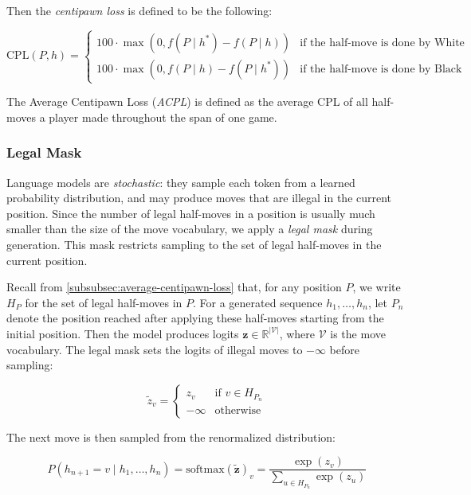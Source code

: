 \documentclass[11pt, a4paper]{article}
\begin{document}
Then the \textit{centipawn loss} is defined to be the following:

\[
\text{CPL}(P, h) = 
\begin{cases}
100 \cdot \max(0, f(P \mid h^*) - f(P \mid h)) &\text{if the half-move is done by White} \\
100 \cdot \max(0, f(P \mid h) - f(P \mid h^*)) &\text{if the half-move is done by Black}
\end{cases}
\]

The Average Centipawn Loss (\textit{ACPL}) is defined as the average CPL of all half-moves a player made throughout the span of one game.

\subsubsection{Legal Mask} \label{sec:legal-mask}

Language models are \textit{stochastic}: they sample each token from a learned probability distribution, and may produce moves that are illegal in the current position. Since the number of legal half-moves in a position is usually much smaller than the size of the move vocabulary, we apply a \textit{legal mask} during generation. This mask restricts sampling to the set of legal half-moves in the current position.

Recall from \cref{subsubsec:average-centipawn-loss} that, for any position \(P\), we write \(H_P\) for the set of legal half-moves in \(P\). For a generated sequence \(h_1, \dots, h_n\), let \(P_n\) denote the position reached after applying these half-moves starting from the initial position. Then the model produces logits \(\mathbf{z} \in \mathbb{R}^{|\mathcal{V}|}\), where \(\mathcal{V}\) is the move vocabulary. The legal mask sets the logits of illegal moves to \(-\infty\) before sampling:

\begin{equation}
    \tilde{z}_v =
    \begin{cases}
        z_v & \text{if } v \in H_{P_n} \\
        -\infty & \text{otherwise}
    \end{cases}
\end{equation}

The next move is then sampled from the renormalized distribution:

\begin{equation}
    P(h_{n+1} = v \mid h_1, \dots, h_n)
    = \text{softmax}(\tilde{\mathbf{z}})_v
    = \frac{\exp(z_v)}{\displaystyle\sum_{u \in H_{P_n}} \exp(z_u)}
\end{equation}
\end{document}
